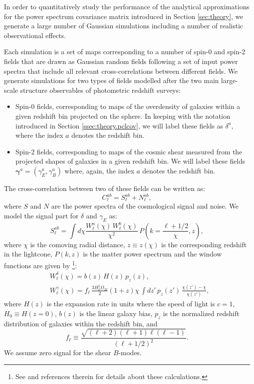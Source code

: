 \documentclass[a4paper,11pt]{article}
\begin{document}
      In order to quantitatively study the performance of the analytical approximations for the power spectrum covariance matrix introduced in Section \ref{sec:theory}, we generate a large number of Gaussian simulations including a number of realistic observational effects.
      
      Each simulation is a set of maps corresponding to a number of spin-0 and spin-2 fields that are drawn as Gaussian random fields following a set of input power spectra that include all relevant cross-correlations between different fields. We generate simulations for two types of fields modelled after the two main large-scale structure observables of photometric redshift surveys:
      \begin{itemize}
        \item Spin-0 fields, corresponding to maps of the overdensity of galaxies within a given redshift bin projected on the sphere. In keeping with the notation introduced in Section \ref{ssec:theory.pclcov}, we will label these fields as $\delta^a$, where the index $a$ denotes the redshift bin.
        \item Spin-2 fields, corresponding to maps of the cosmic shear measured from the projected shapes of galaxies in a given redshift bin. We will label these fields $\boldsymbol{\gamma}^a=(\gamma_E^a,\gamma_B^a)$ where, again, the index $a$ denotes the redshift bin.
      \end{itemize}
      The cross-correlation between two of these fields can be written as:
      \begin{equation}
        C^{ab}_\ell = S^{ab}_\ell+N^{ab}_\ell,
      \end{equation}
      where $S$ and $N$ are the power spectra of the cosmological signal and noise. We model the signal part for $\delta$ and $\gamma_E$ as:
      \begin{equation}
        S^{ab}_\ell = \int d\chi \frac{W^a_\ell(\chi)\,W^b_\ell(\chi)}{\chi^2}\,P\left(k=\frac{\ell+1/2}{\chi},z\right),
      \end{equation}
      where $\chi$ is the comoving radial distance, $z\equiv z(\chi)$ is the corresponding redshift in the lightcone, $P(k,z)$ is the matter power spectrum and the window functions are given by \cite{2004PhRvD..70d3009H}\footnote{See \cite{2019ApJS..242....2C} and references therein for details about these calculations.}:
      \begin{align}
        \nonumber
        &W^\delta_\ell(\chi)=b(z)\,H(z)\,p_z(z),\\
        &W^\gamma_\ell(\chi)=f_\ell\,\frac{3H_0^2\Omega_M}{2}(1+z)\chi\,\int dz'\,p_z(z')\,\frac{\chi(z')-\chi}{\chi(z')},
      \end{align}
      where $H(z)$ is the expansion rate in units where the speed of light is $c=1$, $H_0\equiv H(z=0)$, $b(z)$ is the linear galaxy bias, $p_z$ is the normalized redshift distribution of galaxies within the redshift bin, and
      \begin{equation}
        f_\ell\equiv\frac{\sqrt{(\ell+2)(\ell+1)\ell(\ell-1)}}{(\ell+1/2)^2}.
      \end{equation}
      We assume zero signal for the shear $B$-modes.
\end{document}
